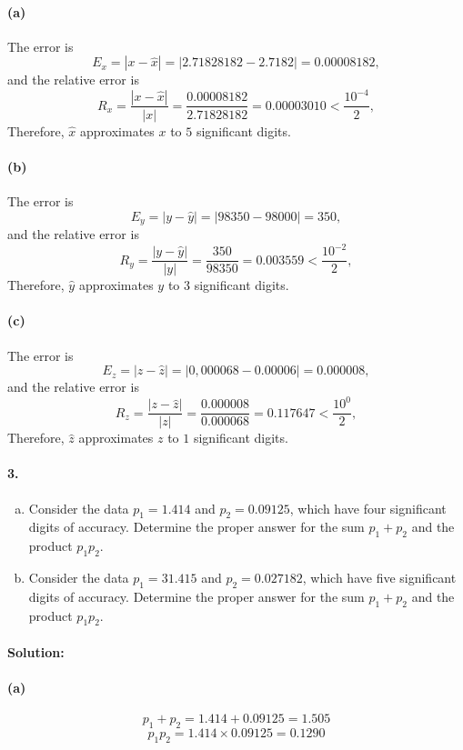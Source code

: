 \documentclass{article}  %
\begin{document}
        \paragraph{(a)}The error is 
        $$E_x = |x - \hat{x}| = |2.71828182 - 2.7182| = 0.00008182,$$
        and the relative error is
        $$R_x = \frac{|x - \hat{x}|}{|x|} = \frac{0.00008182}{2.71828182} = 0.00003010 < \frac{10^{-4}}{2},$$
        Therefore, \(\hat{x}\) approximates \(x\) to \(5\) significant digits. 
        \paragraph{(b)}The error is 
        $$E_y = |y - \hat{y}| = |98350 - 98000| = 350,$$
        and the relative error is
        $$R_y = \frac{|y - \hat{y}|}{|y|} = \frac{350}{98350} = 0.003559 < \frac{10^{-2}}{2},$$
        Therefore, \(\hat{y}\) approximates \(y\) to \(3\) significant digits. 
        \paragraph{(c)}The error is 
        $$E_z = |z - \hat{z}| = |0,000068 - 0.00006| = 0.000008,$$
        and the relative error is
        $$R_z = \frac{|z - \hat{z}|}{|z|} = \frac{0.000008}{0.000068} = 0.117647 < \frac{10^{0}}{2},$$
        Therefore, \(\hat{z}\) approximates \(z\) to \(1\) significant digits. 
        \paragraph{3.}
        \begin{enumerate}[(a)]
            \item Consider the data \(p_1 = 1.414\) and \(p_2 = 0.09125\), which have four significant digits of accuracy. Determine the proper answer for the sum \(p_1 + p_2\) and the product \(p_1p_2\).
            \item Consider the data \(p_1 = 31.415\) and \(p_2 = 0.027182\), which have five significant digits of accuracy. Determine the proper answer for the sum \(p_1 + p_2\) and the product \(p_1p_2\).
        \end{enumerate}
        \paragraph{Solution:}
        \paragraph{(a)}
        $$p_1 + p_2 = 1.414 + 0.09125 = 1.505$$
        $$p_1p_2 = 1.414 \times 0.09125 = 0.1290$$
\end{document}
